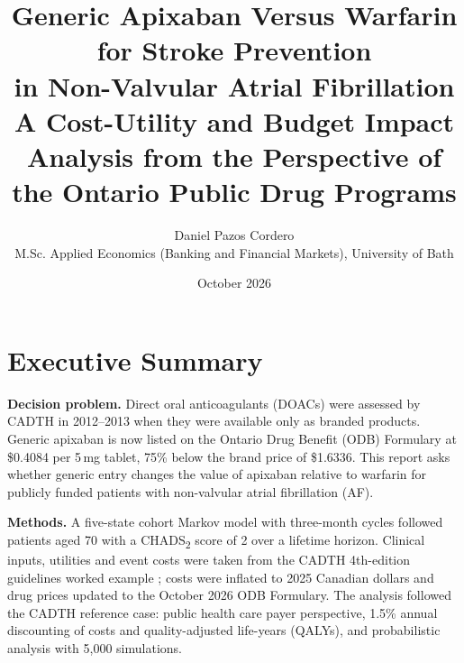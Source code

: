 \documentclass[11pt,letterpaper]{article}
\title{\textbf{Generic Apixaban Versus Warfarin for Stroke Prevention\\in Non-Valvular Atrial Fibrillation}\\[4pt]
\large A Cost-Utility and Budget Impact Analysis from the Perspective of\\the Ontario Public Drug Programs}
\author{Daniel Pazos Cordero\\[2pt]
\small M.Sc. Applied Economics (Banking and Financial Markets), University of Bath}
\date{October 2026}
\begin{document}
\maketitle

\begin{center}
\end{center}

\section*{Executive Summary}

\textbf{Decision problem.} Direct oral anticoagulants (DOACs) were assessed by CADTH in
2012--2013 when they were available only as branded products. Generic apixaban is now listed
on the Ontario Drug Benefit (ODB) Formulary at \$0.4084 per 5\,mg tablet, 75\% below the
brand price of \$1.6336. This report asks whether generic entry changes the value of apixaban
relative to warfarin for publicly funded patients with non-valvular atrial fibrillation (AF).

\textbf{Methods.} A five-state cohort Markov model with three-month cycles followed patients
aged 70 with a CHADS\textsubscript{2} score of 2 over a lifetime horizon. Clinical inputs,
utilities and event costs were taken from the CADTH 4th-edition guidelines worked example
\cite{cadthwe}; costs were inflated to 2025 Canadian dollars and drug prices updated to the
October 2026 ODB Formulary. The analysis followed the CADTH reference case: public health
care payer perspective, 1.5\% annual discounting of costs and quality-adjusted life-years
(QALYs), and probabilistic analysis with 5,000 simulations.
\end{document}
